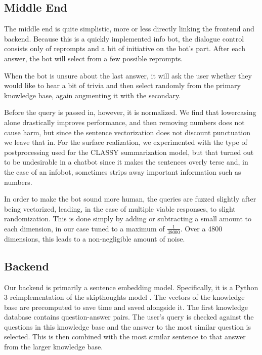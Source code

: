 \documentclass[11pt]{article}
\begin{document}
\subsection{Middle End}

The middle end is quite simplistic, more or less directly linking the frontend and backend. Because this is a quickly implemented info bot, the dialogue control consists only of reprompts and a bit of initiative on the bot's part. After each answer, the bot will select from a few possible reprompts.

When the bot is unsure about the last answer, it will ask the user whether they would like to hear a bit of trivia and then select randomly from the primary knowledge base, again augmenting it with the secondary.

Before the query is passed in, however, it is normalized. We find that lowercasing alone drastically improves performance, and then removing numbers does not cause harm, but since the sentence vectorization does not discount punctuation we leave that in. For the surface realization, we experimented with the type of postprocessing used for the CLASSY \cite{classy} summarization model, but that turned out to be undesirable in a chatbot since it makes the sentences overly terse and, in the case of an infobot, sometimes strips away important information such as numbers.

In order to make the bot sound more human, the queries are fuzzed slightly after being vectorized, leading, in the case of multiple viable responses, to slight randomization. This is done simply by adding or subtracting a small amount to each dimension, in our case tuned to a maximum of $\frac{1}{38000}$. Over a 4800 dimensions, this leads to a non-negligible amount of noise.

\subsection{Backend}

Our backend is primarily a sentence embedding model. Specifically, it is a Python 3 reimplementation of the skipthoughts model \cite{kiros2015}. The vectors of the knowledge base are precomputed to save time and saved alongside it. The first knowledge database contains question-answer pairs. The user's query is checked against the questions in this knowledge base and the answer to the most similar question is selected. This is then combined with the most similar sentence to that answer from the larger knowledge base.
\end{document}
